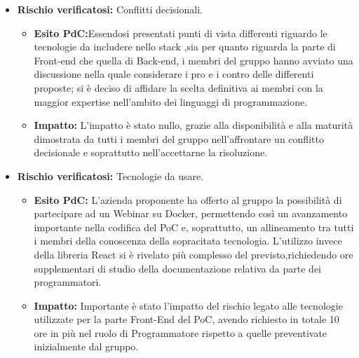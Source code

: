 \begin{itemize}
\item \textbf{Rischio verificatosi:} Conflitti decisionali.

\begin{itemize}
\item \textbf{Esito PdC:}Essendosi presentati punti di vista differenti riguardo le tecnologie da includere nello stack ,sia per quanto riguarda la parte di Front-end  che quella di Back-end, i membri del gruppo 
hanno avviato una discussione nella quale considerare i pro e i contro delle differenti proposte; si è deciso di 
affidare la scelta definitiva ai membri con la maggior expertise nell'ambito dei linguaggi di programmazione.
\item \textbf{Impatto:} L'impatto è stato nullo, grazie alla disponibilità e alla maturità dimostrata da tutti i membri del gruppo
nell'affrontare un conflitto decisionale e soprattutto nell'accettarne la risoluzione.  
\end{itemize}

\item \textbf{Rischio verificatosi:} Tecnologie da usare.
\begin{itemize}
\item \textbf{Esito PdC:} L'azienda proponente ha offerto al gruppo la possibilità di partecipare ad un Webinar
su Docker, permettendo così un avanzamento 
importante nella codifica del PoC e, soprattutto, un allineamento tra tutti i membri della conoscenza della sopracitata tecnologia.
L'utilizzo invece della libreria React si è rivelato più complesso del previsto,richiedendo ore supplementari di studio della documentazione relativa
da parte dei programmatori.\\
\item \textbf{Impatto:} Importante è stato l'impatto del rischio legato alle tecnologie utilizzate per la parte Front-End del PoC,
avendo richiesto in totale 10 ore in più nel ruolo di Programmatore rispetto a quelle preventivate inizialmente dal gruppo.\\
\end{itemize}


\end{itemize}
